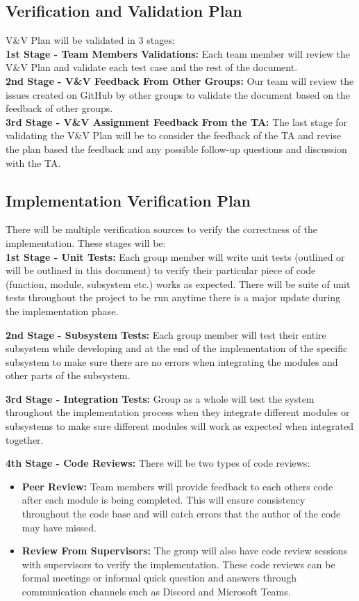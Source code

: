 \documentclass[12pt, titlepage]{article}
\begin{document}
\subsection{Verification and Validation Plan}


V\&V Plan will be validated in 3 stages:\\
\textbf{1st Stage - Team Members Validations:} Each team member will review the V\&V Plan and validate each test case and the rest of the document.\\
\textbf{2nd Stage - V\&V Feedback From Other Groups:} Our team will review the issues created on GitHub by other groups to validate the document based on the feedback of other groups.\\
\textbf{3rd Stage - V\&V Assignment Feedback From the TA:} The last stage for validating the V\&V Plan will be to consider the feedback of the TA and revise the plan based the feedback and any possible follow-up questions and discussion with the TA.



\subsection{Implementation Verification Plan}

There will be multiple verification sources to verify the correctness of the implementation. These stages will be:\\

\textbf{1st Stage - Unit Tests:} Each group member will write unit tests (outlined or will be outlined in this document) to verify their particular piece of code (function, module, subsystem etc.) works as expected. There will be suite of unit tests throughout the project to be run anytime there is a major update during the implementation phase.

\textbf{2nd Stage - Subsystem Tests:} Each group member will test their entire subsystem while developing and at the end of the implementation of the specific subsystem to make sure there are no errors when integrating the modules and other parts of the subsystem.

\textbf{3rd Stage - Integration Tests:} Group as a whole will test the system throughout the implementation process when they integrate different modules or subsystems to make sure different modules will work as expected when integrated together.

\textbf{4th Stage - Code Reviews:} There will be two types of code reviews:
\begin{itemize}
    \item \textbf{Peer Review:} Team members will provide feedback to each others code after each module is being completed. This will ensure consistency throughout the code base and will catch errors that the author of the code may have missed.
    \item \textbf{Review From Supervisors:} The group will also have code review sessions with supervisors to verify the implementation. These code reviews can be formal meetings or informal quick question and answers through communication channels such as Discord and Microsoft Teams.
\end{itemize}
\end{document}

